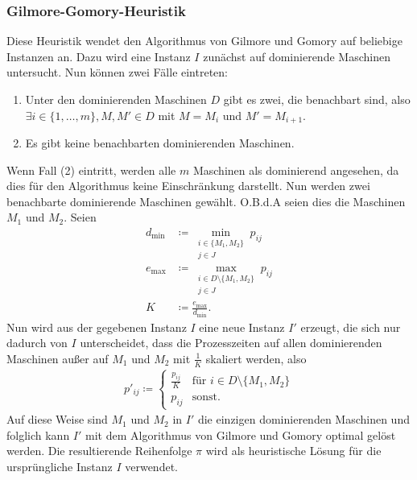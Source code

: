 \documentclass{scrreprt}
\begin{document}
\subsubsection{Gilmore-Gomory-Heuristik}
Diese Heuristik wendet den Algorithmus von Gilmore und Gomory auf beliebige Instanzen an.
Dazu wird eine Instanz $I$ zunächst auf dominierende Maschinen untersucht.
Nun können zwei Fälle eintreten:
\begin{enumerate}
    \item Unter den dominierenden Maschinen $D$ gibt es zwei, die benachbart sind, also $\exists i\in\{1,\ldots,m\}, M,M'\in D$ mit $M=M_i$ und $M'=M_{i+1}$.
    \item Es gibt keine benachbarten dominierenden Maschinen.
\end{enumerate}
Wenn Fall (2) eintritt, werden alle $m$ Maschinen als dominierend angesehen, da dies für den Algorithmus keine Einschränkung darstellt.
Nun werden zwei benachbarte dominierende Maschinen gewählt.
O.B.d.A seien dies die Maschinen $M_1$ und $M_2$. Seien 
\begin{align} 
    d_{\min} &\coloneqq \min_{\substack{i\in \{M_1,M_2\} \\ j\in J}} p_{ij} \\
    e_{\max} &\coloneqq \max_{\substack{i\in D\setminus\{M_1,M_2\} \\ j\in J}} p_{ij} \\
    K &\coloneqq \frac{e_{\max}}{d_{\min}} \text{.}
\end{align}
Nun wird aus der gegebenen Instanz $I$ eine neue Instanz $I'$ erzeugt, die sich nur dadurch von $I$ unterscheidet, dass die Prozesszeiten
auf allen dominierenden Maschinen außer auf $M_1$ und $M_2$ mit $\frac{1}{K}$ skaliert werden, also
\begin{align}
    p'_{ij} \coloneqq \begin{cases} \frac{p_{ij}}{K} &\text{für } i\in D\setminus\{M_1,M_2\} \\ p_{ij} &\text{sonst.} \end{cases}
\end{align}
Auf diese Weise sind $M_1$ und $M_2$ in $I'$ die einzigen dominierenden Maschinen und folglich kann $I'$ mit dem Algorithmus von Gilmore und Gomory optimal gelöst werden.
Die resultierende Reihenfolge $\pi$ wird als heuristische Lösung für die ursprüngliche Instanz $I$ verwendet.
\end{document}
